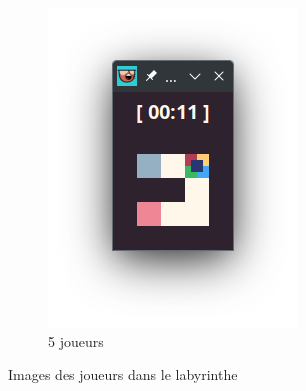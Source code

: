\begin{figure}[!htb]
\begin{subfigure}[b]{0.2\textwidth}
        \includegraphics[width=\textwidth]{ressources/Implementation/Labyrinthe/Vue/Players/5Players.png}
        \caption{5 joueurs}
    \end{subfigure}

    \caption{Images des joueurs dans le labyrinthe}
\end{figure}

